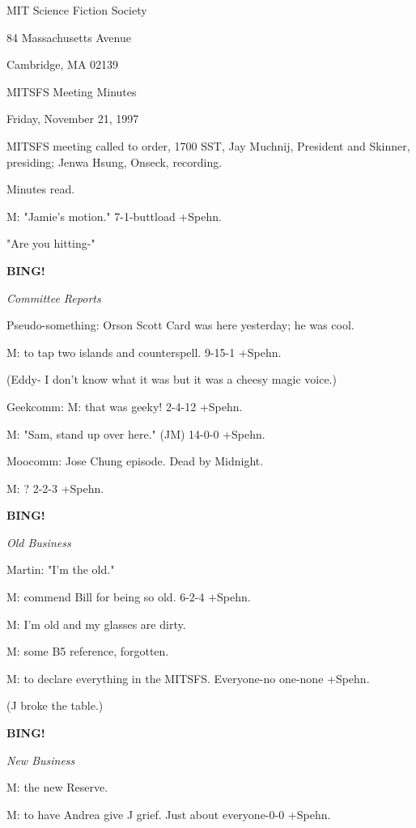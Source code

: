 \documentclass[12pt]{article}
\newcommand{\bing}{{\bf BING!} }
\newcommand{\goto}[1]{\bing \vskip 12pt \centerline{{\em{#1}}}}
\begin{document}
\begin{center}

MIT Science Fiction Society 

84 Massachusetts Avenue

Cambridge, MA 02139

\vspace{12pt}

MITSFS Meeting Minutes 

Friday, November 21, 1997

\end{center}
 
\vspace{18pt}

\setlength{\parskip}{6pt}

\noindent
MITSFS meeting called to order, 1700 SST,
Jay Muchnij, President and Skinner, presiding; Jenwa Hsung, Onseck, recording.

Minutes read.

M: "Jamie's motion." 7-1-buttload +Spehn.

"Are you hitting-"

\goto{Committee Reports}

Pseudo-something: Orson Scott Card was here yesterday; he was cool.

M: to tap two islands and counterspell. 9-15-1 +Spehn.

(Eddy- I don't know what it was but it was a cheesy magic voice.)

Geekcomm: M: that was geeky! 2-4-12 +Spehn.

M: "Sam, stand up over here." (JM) 14-0-0 +Spehn.

Moocomm: Jose Chung episode. Dead by Midnight.

M: ? 2-2-3 +Spehn.

\goto{Old Business}

Martin: "I'm the old."

M: commend Bill for being so old. 6-2-4 +Spehn.

M: I'm old and my glasses are dirty.

M: some B5 reference, forgotten.

M: to declare everything in the MITSFS. Everyone-no one-none +Spehn.

(J broke the table.)

\goto{New Business}

M: the new Reserve.

M: to have Andrea give J grief. Just about everyone-0-0 +Spehn.
\end{document}
